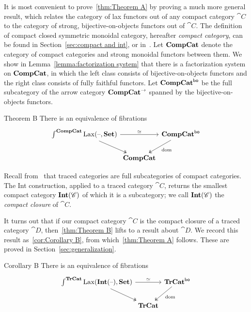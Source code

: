 \documentclass[12pt,oneside,article,draft]{memoir}
\begin{document}
It is most convenient to prove~\ref{thm:Theorem A} by proving a much more general result, which
relates the category of lax functors out of any compact category $\cat{C}$ to the category of
strong, bijective-on-objects functors out of $\cat{C}$.  The definition of compact closed symmetric
monoidal category, hereafter \emph{compact category}, can be found in Section~\ref{sec:compact and
int}, or in~\cite{MacLane}.  Let $\mathbf{CompCat}$ denote the category of compact categories and strong
monoidal functors between them.  We show in Lemma~\ref{lemma:factorization system} that there is a
factorization system on $\mathbf{CompCat}$, in which the left class consists of bijective-on-objects
functors and the right class consists of fully faithful functors. Let $\mathbf{CompCat}^{\mathsf{bo}}$ be the full
subcategory of the arrow category $\mathbf{CompCat}^{\to}$ spanned by the bijective-on-objects functors.

\begin{named}{Theorem B}
   There is an equivalence of fibrations
   \begin{equation*}
      \begin{tikzcd}[column sep=0em]
         \int^{\CompCat}\Lax(\textrm{--},\Set) \ar[rr,"\equiv"] \ar[dr,two heads]
            && \CompCat^{\bo} \ar[dl,two heads,"\dom"] \\
            & \CompCat &
      \end{tikzcd}
   \end{equation*}
\end{named}

Recall from~\cite{JoyalStreetVerity} that traced categories are full subcategories of compact
categories.  The Int construction, applied to a traced category $\cat{C}$, returns the smallest
compact category $\mathbf{Int}(\mathscr{C})$ of which it is a subcategory; we call $\mathbf{Int}(\mathscr{C})$ the
\emph{compact closure} of $\cat{C}$.

It turns out that if our compact category $\cat{C}$ is the compact closure of a traced category
$\cat{D}$, then~\ref{thm:Theorem B} lifts to a result about $\cat{D}$.  We record this result
as~\ref{cor:Corollary B}, from which~\ref{thm:Theorem A} follows.  These are proved in
Section~\ref{sec:generalization}.

\begin{named}{Corollary B}
   There is an equivalence of fibrations
   \begin{equation*}
      \begin{tikzcd}[column sep=0em]
         \int^{\TrCat}\Lax(\Int(\textrm{--}),\Set) \ar[rr,"\equiv"] \ar[dr,two heads]
            && \TrCat^{\bo} \ar[dl,two heads,"\dom"] \\
            & \TrCat &
      \end{tikzcd}
   \end{equation*}
\end{named}
\end{document}
